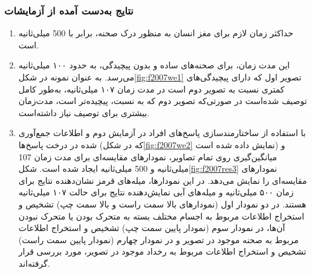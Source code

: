 \subsubsection{نتایج به‌دست‌ آمده از آزمایشات}
\begin{enumerate}
\item
حداکثر زمان لازم برای مغز انسان به منظور درک صحنه، برابر با 500 میلی‌ثانیه است.
\item
این مدت زمان، برای صحنه‌های ساده‌ و بدون پیچیدگی، به حدود ۱۰۰ میلی‌ثانیه می‌رسد. به عنوان نمونه در شکل\ref{fig:f2007we1} تصویر اول که دارای پیچیدگی‌های کمتری نسبت به تصویر دوم است در مدت زمان ۱۰۷ میلی‌ثانیه، به‌طور کامل توصیف شده‌است در صورتی‌که تصویر دوم که به نسبت، پیچیده‌تر است، مدت‌زمان بیشتری برای توصیف نیاز داشته‌است.
\item
با استفاده از ساختارمندسازی پاسخ‌های افراد در آزمایش دوم و اطلاعات جمع‌آوری شده در درخت پاسخ‌ها (که در شکل\ref{fig:f2007we2} نمایش‌ داده شده است) و میانگین‌گیری روی تمام تصاویر، نمودارهای مقایسه‌ای برای مدت زمان 107 میلی‌ثانیه و 500 میلی‌ثانیه ایجاد شده‌ است. شکل\ref{fig:f2007res3}
نمودارهای مقایسه‌ای را نمایش‌ می‌دهد. در این نمودارها، میله‌های قرمز نشان‌دهنده نتایج برای زمان ۵۰۰ میلی‌ثانیه و میله‌های آبی نمایش‌دهنده نتایج برای حالت ۱۰۷ میلی‌ثانیه هستند.
در دو نمودار اول (نمودارهای بالا سمت راست و بالا سمت چپ) تشخیص و استخراج اطلاعات مربوط به اجسام مختلف بسته به متحرک بودن یا متحرک نبودن آن‌ها، در نمودار سوم (نمودار پایین سمت چپ) تشخیص و استخراج اطلاعات مربوط به صحنه موجود در تصویر و در نمودار چهارم‌ (نمودار پایین سمت راست) تشخیص و استخراج اطلاعات مربوط به رخداد موجود در تصویر، مورد بررسی قرار گرفته‌اند.



\end{enumerate}
